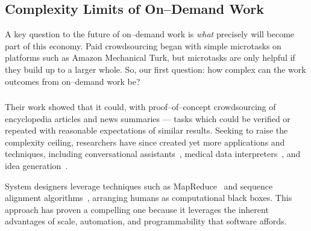 \documentclass[trackingWork]{subfiles}
\begin{document}
\begin{comment}
Crowdwork
  - Kittur said let's do complex stuff
  - This works by using CS techniques
  - Clear that this works in focused cases
  - More recent shift toward using experts
\end{comment}

\subsection[What are the complexity limits of on--demand work]
{Complexity Limits of On--Demand Work}\label{sec:complexity}
A key question to the future of on--demand work is
\textit{what} precisely will become part of this economy.
Paid crowdsourcing began with simple microtasks on platforms such as
Amazon Mechanical Turk, but
microtasks are only helpful if they build up to a larger whole.
So, our first question:
how complex can the work outcomes from on--demand work be?

\subsubsection{\crowdworkpers}
Their work showed that it could, with proof--of--concept crowdsourcing of
encyclopedia articles and news summaries
--- tasks which could be verified or repeated
with reasonable expectations of similar results.
Seeking to raise the complexity ceiling,
researchers have since created
yet more applications and techniques,
including conversational assistants~\cite{lasecki2013chorus},
medical data interpreters~\cite{lasecki2013chorus}, and
idea generation~\cite{YuEncouragingOutside,yu2014distributed,Yu2016a}.

System designers leverage techniques such as MapReduce~\cite{crowdForgeKittur} and
sequence alignment algorithms~\cite{lasecki2012real}, arranging humans as computational black boxes.
This approach has proven a compelling one because
it leverages the inherent advantages of
scale,
automation, and
programmability that software affords.
\end{document}
